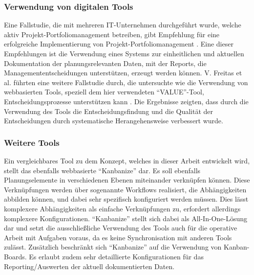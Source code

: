 \subsubsection{Verwendung von digitalen Tools}
Eine Fallstudie, die mit mehreren IT-Unternehmen durchgeführt wurde, welche aktiv Projekt-Portfoliomanagement betreiben, gibt Empfehlung für eine erfolgreiche Implementierung von Projekt-Portfoliomanagement \cite{guidelinesForPortfoliomanagement}.
Eine dieser Empfehlungen ist die Verwendung eines Systems zur einheitlichen und aktuellen Dokumentation der planungsrelevanten Daten, mit der Reports, die Managemententscheidungen unterstützen, erzeugt werden können.
V. Freitas et al. führten eine weitere Fallstudie durch, die untersuchte wie die Verwendung von webbasierten Tools, speziell dem hier verwendeten ``VALUE''-Tool, Entscheidungsprozesse unterstützen kann \cite{Value-Based-Decision-Making-Case-Study}. Die Ergebnisse zeigten, dass durch die Verwendung des Tools die Entscheidungsfindung und die Qualität der Entscheidungen durch systematische Herangehensweise verbessert wurde.

\subsubsection{Weitere Tools}
Ein vergleichbares Tool zu dem Konzept, welches in dieser Arbeit entwickelt wird, stellt das ebenfalls webbasierte ``Kanbanize'' dar. Es soll ebenfalls Planungselemente in verschiedenen Ebenen miteinander verknüpfen können. Diese Verknüpfungen werden über sogenannte Workflows realisiert, die Abhängigkeiten abbilden können, und dabei sehr spezifisch konfiguriert werden müssen. Dies lässt komplexere Abhängigkeiten als einfache Verknüpfungen zu, erfordert allerdings komplexere Konfigurationen. ``Kanbanize'' stellt sich dabei als All-In-One-Lösung dar und setzt die ausschließliche Verwendung des Tools auch für die operative Arbeit mit Aufgaben voraus, da es keine Synchronisation mit anderen Tools zulässt. Zusätzlich beschränkt sich ``Kanbanize'' auf die Verwendung von Kanban-Boards. Es erlaubt zudem sehr detaillierte Konfigurationen für das Reporting/Auswerten der aktuell dokumentierten Daten.
